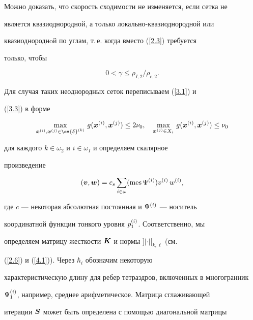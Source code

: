 Можно доказать, что скорость сходимости не изменяется, если сетка не


является квазиоднородной, а только локально-квазиоднородной или


квазиоднороднoй по углам, т.\,е. когда вместо (\ref{2.3}) требуется


только, чтобы


\begin{equation}\label{4.13}


0<\gamma\le\rho_{I,2}\big/\rho_{c,2}.


\end{equation}


Для случая таких неоднородных сеток переписываем (\ref{3.1}) и


(\ref{3.3}) в форме


\begin{equation}\label{4.14}


\max_{{\bi x}\up i, {\bi x}\up j\in\ov{\delta}\up k}\,


g({\bi x}\up i, {\bi x}\up


j)\le 2\nu_0,\quad\max\limits_{{\bi x}\up j\in X_i}\,


g({\bi x}\up i, {\bi x}\up j)\le\nu_0


\end{equation}


для каждого $k\in\omega_2$ и $i\in\omega_I$ и определяем скалярное


произведение


\begin{equation}\label{4.15}


({\bi v}, {\bi w})=c_s\sum_{i\in\omega}(\mes\Psi\up i) v\up i\, w\up i,


\end{equation}


где $c$ --- некоторая абсолютная постоянная и $\Psi^{(i)}$ --- носитель


координатной функции тонкого уровня $p_1^{(i)}$. Соответственно, мы


определяем матрицу жесткости $\boldsymbol K$ и нормы $]|\cdot|[_{{k,\ell}}$ (см.


(\ref{2.6}) и (\ref{4.1})). Через $\hbar_i$ обозначим некоторую


характеристическую длину для ребер тетраэдров, включенных в многогранник


$\Psi_1^{(i)}$, например, среднее арифметическое. Матрица сглаживающей


итерации $\boldsymbol S$ может быть определена с помощью диагональной матрицы


